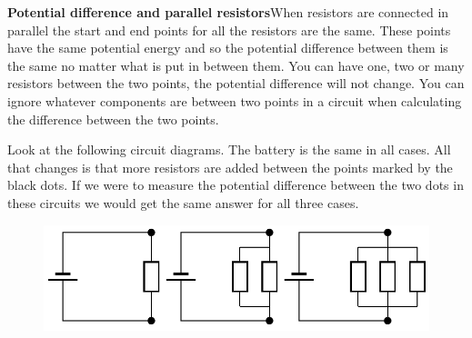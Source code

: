           \par 




        \label{m38776*id64009}\noindent{}\textbf{Potential difference and parallel resistors}When resistors are connected in parallel the start and end points for all the resistors are the same. These points have the same potential energy and so the potential difference between them is the same no matter what is put in between them. You can have one, two or many resistors between the two points, the potential difference will not change. You can ignore whatever components are between two points in a circuit when calculating the difference between the two points.\par 
        \label{m38776*id64017}Look at the following circuit diagrams. The battery is the same in all cases. All that changes is that more resistors are added between the points marked by the black dots. If we were to measure the potential difference between the two dots in these circuits we would get the same answer for all three cases.\par 
        \label{m38776*id64023}
          
    \setcounter{subfigure}{0}


	\begin{figure}[H] %
    \begin{center}
    \label{m38776*id64026!!!underscore!!!media}\label{m38776*id64026!!!underscore!!!printimage}\includegraphics[width=\columnwidth]{col11305.imgs/m38776_PG10C9_016.png} %
        
      \vspace{2pt}
    \vspace{.1in}
    
    \end{center}

 \end{figure}   

    \addtocounter{footnote}{-0}
    
